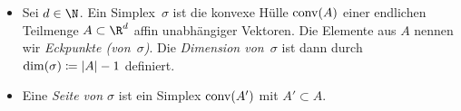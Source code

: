 \begin{thDef}
    \label{gsc:def:simplex}
    \hfill
    \begin{itemize}
        \item
            Sei $d\in\N$. Ein Simplex~$\sigma$ ist die konvexe Hülle $\operatorname{conv}(A)$ einer 
            endlichen Teilmenge $A\subset\R^d$ affin unabhängiger Vektoren.
            Die Elemente aus $A$ nennen wir \emph{Eckpunkte (von~$\sigma$)}. 
            Die \emph{Dimension von~$\sigma$} ist dann durch 
            $\dim(\sigma) \coloneqq \lvert A\rvert-1$ definiert.
        \item
            Eine \emph{Seite von $\sigma$} ist ein Simplex $\operatorname{conv}(A')$ mit
            $A'\subset A$.
    \end{itemize}
\end{thDef}
%
%            

